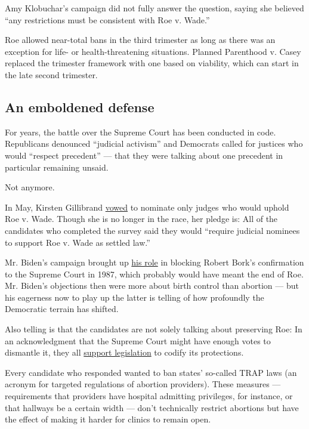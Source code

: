 Amy Klobuchar's campaign did not fully answer the question, saying she
believed ``any restrictions must be consistent with Roe v. Wade.''

Roe allowed near-total bans in the third trimester as long as there was
an exception for life- or health-threatening situations. Planned
Parenthood v. Casey replaced the trimester framework with one based on
viability, which can start in the late second trimester.

\hypertarget{an-emboldened-defense}{%
\subsection{An emboldened defense}\label{an-emboldened-defense}}

For years, the battle over the Supreme Court has been conducted in code.
Republicans denounced ``judicial activism'' and Democrats called for
justices who would ``respect precedent'' --- that they were talking
about one precedent in particular remaining unsaid.

Not anymore.

In May, Kirsten Gillibrand
\href{https://medium.com/team-gillibrand/i-will-only-nominate-judges-who-will-uphold-roe-v-wade-and-protect-reproductive-rights-daa1b24ed81b}{vowed}
to nominate only judges  who would uphold Roe v. Wade. Though she is no
longer in the race, her pledge is: All of the candidates who completed
the survey said they would ``require judicial nominees to support Roe v.
Wade as settled law.''

Mr. Biden's campaign brought up
\href{https://www.nytimes3xbfgragh.onion/2019/09/07/us/politics/joe-biden-bork-supreme-court.html}{his
role} in blocking Robert Bork's confirmation to the Supreme Court in
1987, which probably would have meant the end of Roe. Mr. Biden's
objections then were more about birth control than abortion --- but his
eagerness now to play up the latter is telling of how profoundly the
Democratic terrain has shifted.

Also telling is that the candidates are not solely talking about
preserving Roe: In an acknowledgment that the Supreme Court might have
enough votes to dismantle it, they all
\href{https://www.nytimes3xbfgragh.onion/2019/05/17/us/politics/alabama-abortion-law-democrats-roe.html}{support
legislation} to codify its protections.

Every candidate who responded wanted to ban states' so-called TRAP laws
(an acronym for targeted regulations of abortion providers). These
measures --- requirements that providers have hospital admitting
privileges, for instance, or that hallways be a certain width --- don't
technically restrict abortions but have the effect of making it harder
for clinics to remain open.


